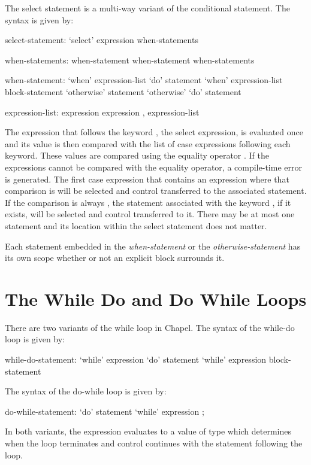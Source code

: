 The select statement is a multi-way variant of the conditional
statement.  The syntax is given by:
\begin{syntax}
select-statement:
  `select' expression { when-statements }

when-statements:
  when-statement
  when-statement when-statements

when-statement:
  `when' expression-list `do' statement
  `when' expression-list block-statement
  `otherwise' statement
  `otherwise' `do' statement

expression-list:
  expression
  expression , expression-list
\end{syntax}
The expression that follows the keyword , the select
expression, is evaluated once and its value is then compared
with the list of case expressions following each
 keyword. These values are compared using the equality
operator \chpl{==}.  If the expressions cannot be compared with the
equality operator, a compile-time error is generated.  The first case
expression that contains an expression where that comparison
is  will be selected and control transferred to the
associated statement.  If the comparison is always , the
statement associated with the keyword , if it exists,
will be selected and control transferred to it.  There may be at most
one  statement and its location within the select
statement does not matter.

Each statement embedded in the {\em when-statement} or the {\em otherwise-statement} has its own scope
whether or not an explicit block surrounds it.

\section{The While Do and Do While Loops}
\label{The_While_and_Do_While_Loops}

There are two variants of the while loop in Chapel.  The syntax of the
while-do loop is given by:
\begin{syntax}
while-do-statement:
  `while' expression `do' statement
  `while' expression block-statement
\end{syntax}
The syntax of the do-while loop is given by:
\begin{syntax}
do-while-statement:
  `do' statement `while' expression ;
\end{syntax}
In both variants, the expression evaluates to a value of type 
which determines when the loop terminates and control continues with
the statement following the loop.

